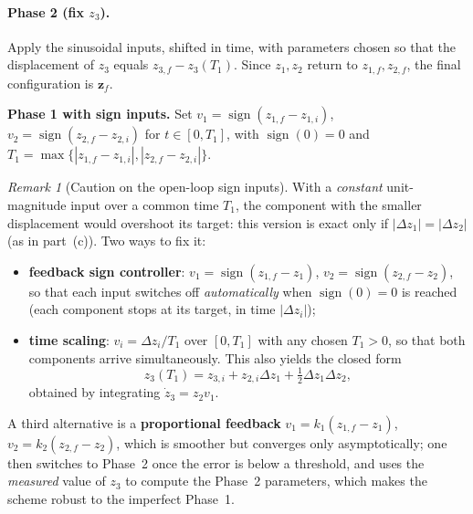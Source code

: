 \documentclass[11pt,a4paper]{article}
\theoremstyle{definition}
\theoremstyle{plain}
\theoremstyle{remark}
\newtheorem{remark}[definition]{Remark}
\newcommand{\z}{\boldsymbol{z}}
\newcommand{\sgn}{\operatorname{sign}}
\begin{document}
\paragraph{Phase 2 (fix $z_3$).} Apply the sinusoidal inputs, shifted in time, with parameters chosen so that the displacement of $z_3$ equals $z_{3,f}-z_3(T_1)$. Since $z_1,z_2$ return to $z_{1,f},z_{2,f}$, the final configuration is $\z_f$.

\medskip
\noindent\textbf{Phase 1 with sign inputs.} Set $v_1=\sgn(z_{1,f}-z_{1,i})$, $v_2=\sgn(z_{2,f}-z_{2,i})$ for $t\in[0,T_1]$, with $\sgn(0)=0$ and $T_1=\max\{|z_{1,f}-z_{1,i}|,|z_{2,f}-z_{2,i}|\}$.

\begin{remark}[Caution on the open-loop sign inputs]
With a \emph{constant} unit-magnitude input over a common time $T_1$, the component with the smaller displacement would overshoot its target: this version is exact only if $|\Delta z_1|=|\Delta z_2|$ (as in part~(c)). Two ways to fix it:
\begin{itemize}[nosep]
  \item \textbf{feedback sign controller}: $v_1=\sgn(z_{1,f}-z_1)$, $v_2=\sgn(z_{2,f}-z_2)$, so that each input switches off \emph{automatically} when $\sgn(0)=0$ is reached (each component stops at its target, in time $|\Delta z_i|$);
  \item \textbf{time scaling}: $v_i=\Delta z_i/T_1$ over $[0,T_1]$ with any chosen $T_1>0$, so that both components arrive simultaneously. This also yields the closed form
  \begin{equation}
     z_3(T_1)=z_{3,i}+z_{2,i}\Delta z_1+\tfrac12\Delta z_1\Delta z_2,
     \label{eq:z3T1}
  \end{equation}
  obtained by integrating $\dot z_3=z_2v_1$.
\end{itemize}
A third alternative is a \textbf{proportional feedback} $v_1=k_1(z_{1,f}-z_1)$, $v_2=k_2(z_{2,f}-z_2)$, which is smoother but converges only asymptotically; one then switches to Phase~2 once the error is below a threshold, and uses the \emph{measured} value of $z_3$ to compute the Phase~2 parameters, which makes the scheme robust to the imperfect Phase~1.
\end{remark}
\end{document}
